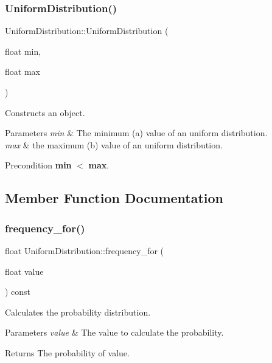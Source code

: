\subsubsection{\texorpdfstring{Uniform\+Distribution()}{UniformDistribution()}}
{\footnotesize\ttfamily Uniform\+Distribution\+::\+Uniform\+Distribution (\begin{DoxyParamCaption}\item[{float}]{min,  }\item[{float}]{max }\end{DoxyParamCaption})\hspace{0.3cm}{\ttfamily [inline]}}

Constructs an object. 
\begin{DoxyParams}{Parameters}
{\em min} & The minimum (a) value of an uniform distribution. \\
\hline
{\em max} & the maximum (b) value of an uniform distribution. \\
\hline
\end{DoxyParams}
\begin{DoxyPrecond}{Precondition}
{\bfseries min} $<$ {\bfseries max}. 
\end{DoxyPrecond}


\subsection{Member Function Documentation}
\mbox{\label{classUniformDistribution_a3e96960abeab2f77b22c3a2b9c80695b}} 
\subsubsection{\texorpdfstring{frequency\+\_\+for()}{frequency\_for()}}
{\footnotesize\ttfamily float Uniform\+Distribution\+::frequency\+\_\+for (\begin{DoxyParamCaption}\item[{float}]{value }\end{DoxyParamCaption}) const\hspace{0.3cm}{\ttfamily [virtual]}}

Calculates the probability distribution. 
\begin{DoxyParams}{Parameters}
{\em value} & The value to calculate the probability. \\
\hline
\end{DoxyParams}
\begin{DoxyReturn}{Returns}
The probability of value. 
\end{DoxyReturn}


